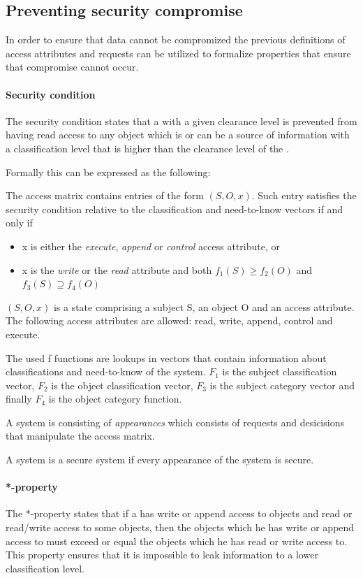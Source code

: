 \subsection{Preventing security compromise}\label{bellap:properties}
In order to ensure that data cannot be compromized the previous definitions of access attributes and requests can be utilized to formalize properties that ensure that compromise cannot occur.

\paragraph{Security condition}
The security condition states that a \principal{} with a given clearance level is prevented from having read access to any object which is or can be a source of information with a classification level that is higher than the clearance level of the \principal{}.

Formally this can be expressed as the following:
\begin{definition}
The access matrix contains entries of the form $(S,O,x)$.
 Such entry satisfies the security condition relative to the classification and need-to-know vectors if and only if

\begin{itemize}
\item x is either the \emph{execute}, \emph{append} or \emph{control} access attribute, or
\item x is the \emph{write} or the \emph{read} attribute and both $f_1(S) \ge f_2(O)$ and $f_3(S) \supseteq f_4(O)$
\end{itemize}

 $(S,O,x)$ is a state comprising a subject S, an object O and an access attribute.
 The following access attributes are allowed: read, write, append, control and execute.

 The used f functions are lookups in vectors that contain information about classifications and need-to-know of the system.
 $F_1$ is the subject classification vector, $F_2$ is the object classification vector, $F_3$ is the subject category vector and finally $F_4$ is the object category function.

A system is consisting of \emph{appearances} which consists of requests and desicisions that manipulate the access matrix.

A system is a secure system if every appearance of the system is secure.
\end{definition}

\paragraph{*-property}
The *-property states that if a \principal{} has write or append access to objects and read or read/write access to some objects, then the objects which he has write or append access to must exceed or equal the objects which he has read or write access to.
This property ensures that it is impossible to leak information to a lower classification level.

